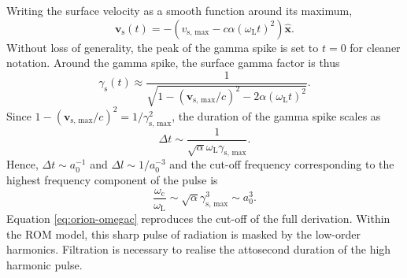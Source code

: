 Writing the surface velocity as a smooth function around its maximum,
\begin{equation}\label{eq:orion-vs}
	\mathbf{v}_\mathrm{s}(t) = -(v_\mathrm{s,\, max} - c\alpha(\omega_\mathrm{L}t)^2) \mathbf{\hat{x}}.
\end{equation}
Without loss of generality, the peak of the gamma spike is set to $t=0$ for cleaner notation. Around the gamma spike, the surface gamma factor is thus
\begin{equation}
	\gamma_\mathrm{s}(t) \approx \frac{1}{\sqrt{1-(\mathbf{v}_\mathrm{s,\, max}/c)^2 - 2\alpha(\omega_\mathrm{L}t)^2}}.
\end{equation}
Since $1-(\mathbf{v}_\mathrm{s,\, max}/c)^2 = 1/\gamma_\mathrm{s,\, max}^2$, the duration of the gamma spike scales as
\begin{equation}
	\Delta t \sim \frac{1}{\sqrt{\alpha }\omega_\mathrm{L} \gamma_\mathrm{s,\, max}}.
\end{equation}
Hence, $\Delta t \sim a_0^{-1}$ and $\Delta l \sim 1/a_0^{-3}$ and the cut-off frequency corresponding to the highest frequency component of the pulse is
\begin{equation}\label{eq:orion-omegac}
	\frac{\omega_\mathrm{c}}{\omega_\mathrm{L}} \sim \sqrt{\alpha}\gamma_\mathrm{s,\, max}^3 \sim a_0^3.
\end{equation}
Equation \ref{eq:orion-omegac} reproduces the cut-off of the full derivation. Within the ROM model, this sharp pulse of radiation is masked by the low-order harmonics. Filtration is necessary to realise the attosecond duration of the high harmonic pulse.

